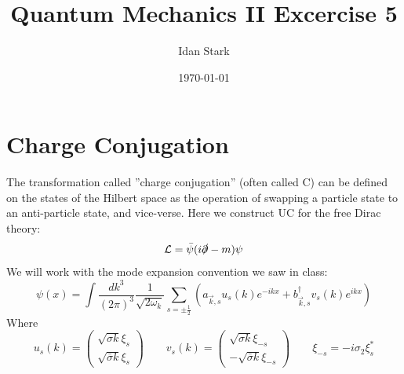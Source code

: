 \documentclass{article}
\title{Quantum Mechanics II Excercise 5}
\author{Idan Stark}
\date{\today}
\begin{document}
\maketitle
\section{Charge Conjugation}
The transformation called ”charge conjugation” (often called C) can be defined on the
states of the Hilbert space as the operation of swapping a particle state to an anti-particle
state, and vice-verse. Here we construct UC for the free Dirac theory:
\begin{equation}
    \mathcal{L} = \bar{\psi}(i\slashed{\partial} - m)\psi
\end{equation}
We will work with the mode expansion convention we saw in class:
\begin{equation}
\label{eq:dirac-field}
    \psi(x) = \int \frac{dk^3}{(2\pi)^3}\frac{1}{\sqrt{2\omega_k}}\sum_{s=\pm\frac{1}{2}} \left(
        a_{\vec{k}, s}u_s(k)e^{-ikx} + b_{\vec{k}, s}^\dagger v_s(k)e^{ikx}
    \right)
\end{equation}
Where
\begin{equation}
    u_s(k) = \begin{pmatrix} \sqrt{\sigma k} \xi_s \\ \sqrt{\bar{\sigma} k} \xi_s \end{pmatrix}
    \qquad
    v_s(k) = \begin{pmatrix} \sqrt{\sigma k} \xi_{-s} \\ -\sqrt{\bar{\sigma} k} \xi_{-s} \end{pmatrix}
    \qquad
    \xi_{-s} = -i\sigma_2\xi_s^*
\end{equation}
\end{document}

